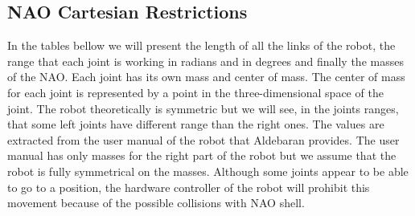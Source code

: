 \subsection{NAO Cartesian Restrictions}
In the tables bellow we will present the length of all the links of the robot, the range that each joint is working in radians and in degrees and finally the masses of the NAO. Each joint has its own mass and center of mass. The center of mass for each joint is represented by a point in the three-dimensional space of the joint. The robot theoretically is symmetric but we will see, in the joints ranges, that some left joints have different range than the right ones. The values are extracted from the user manual of the robot that Aldebaran provides.
The user manual has only masses for the right part of the robot but we assume that the robot is fully symmetrical on the masses.
Although some joints appear to be able to go to a position, the hardware controller of the robot will prohibit this movement because of the possible collisions with NAO shell.

